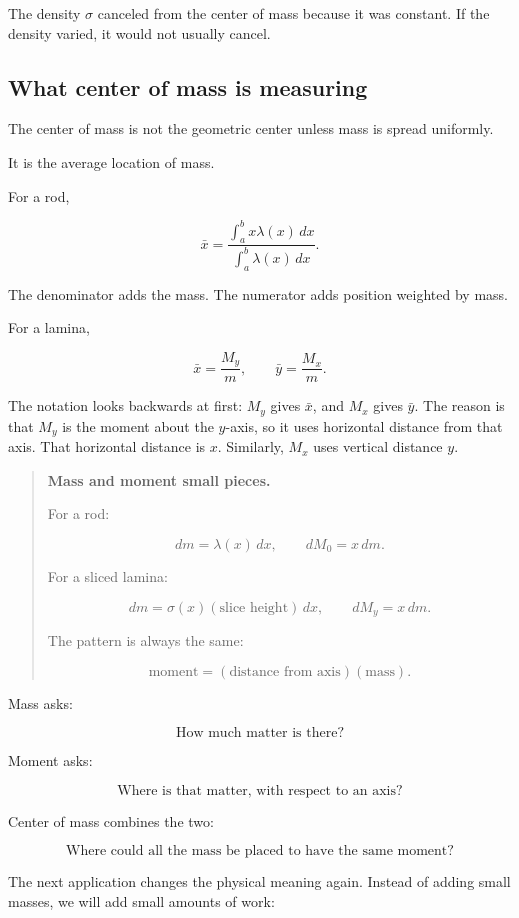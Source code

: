 The density \(\sigma\) canceled from the center of mass because it was constant.  If the
density varied, it would not usually cancel.

\subsection{What center of mass is measuring}
\label{subsec:what-center-of-mass-measures}

The center of mass is not the geometric center unless mass is spread uniformly.

It is the average location of mass.

For a rod,

\[
\bar x
=
\frac{\int_a^b x\lambda(x)\,dx}{\int_a^b \lambda(x)\,dx}.
\]

The denominator adds the mass.  The numerator adds position weighted by mass.

For a lamina,

\[
\bar x
=
\frac{M_y}{m},
\qquad
\bar y
=
\frac{M_x}{m}.
\]

The notation looks backwards at first: \(M_y\) gives \(\bar x\), and \(M_x\) gives
\(\bar y\).  The reason is that \(M_y\) is the moment about the \(y\)-axis, so it uses
horizontal distance from that axis.  That horizontal distance is \(x\).  Similarly,
\(M_x\) uses vertical distance \(y\).

\begin{quote}
\textbf{Mass and moment small pieces.}

For a rod:

\[
dm=\lambda(x)\,dx,
\qquad
dM_0=x\,dm.
\]

For a sliced lamina:

\[
dm=\sigma(x)(\text{slice height})\,dx,
\qquad
dM_y=x\,dm.
\]

The pattern is always the same:

\[
\text{moment}=(\text{distance from axis})(\text{mass}).
\]
\end{quote}

Mass asks:

\[
\text{How much matter is there?}
\]

Moment asks:

\[
\text{Where is that matter, with respect to an axis?}
\]

Center of mass combines the two:

\[
\text{Where could all the mass be placed to have the same moment?}
\]

The next application changes the physical meaning again.  Instead of adding small
masses, we will add small amounts of work:

